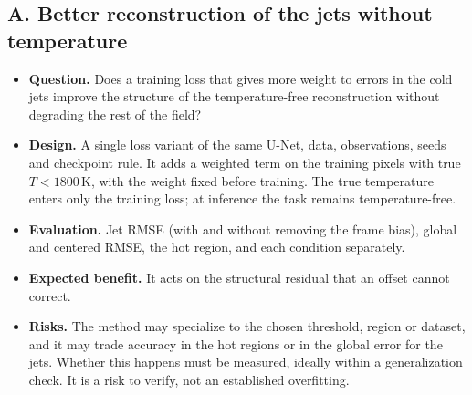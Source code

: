 \documentclass[11pt,letterpaper]{article}
\newcommand{\K}{\,\mathrm{K}}
\begin{document}
\subsection*{A. Better reconstruction of the jets without temperature}
\begin{itemize}
  \item \textbf{Question.} Does a training loss that gives more weight to errors in the cold jets improve the structure of the temperature-free reconstruction without degrading the rest of the field?
  \item \textbf{Design.} A single loss variant of the same U-Net, data, observations, seeds and checkpoint rule. It adds a weighted term on the training pixels with true $T<1800\K$, with the weight fixed before training. The true temperature enters only the training loss; at inference the task remains temperature-free.
  \item \textbf{Evaluation.} Jet RMSE (with and without removing the frame bias), global and centered RMSE, the hot region, and each condition separately.
  \item \textbf{Expected benefit.} It acts on the structural residual that an offset cannot correct.
  \item \textbf{Risks.} The method may specialize to the chosen threshold, region or dataset, and it may trade accuracy in the hot regions or in the global error for the jets. Whether this happens must be measured, ideally within a generalization check. It is a risk to verify, not an established overfitting.
\end{itemize}
\end{document}
